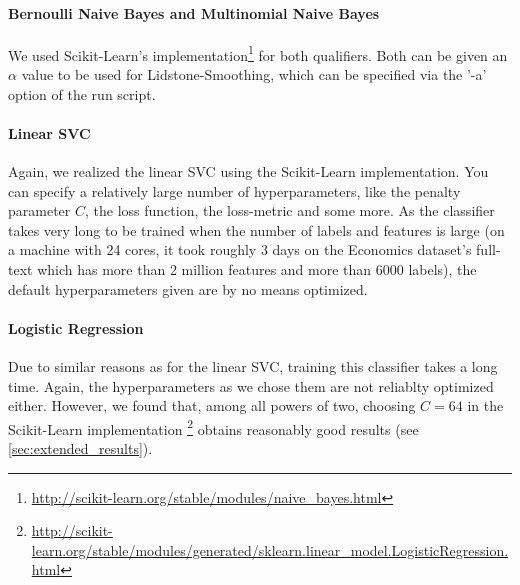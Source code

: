 \documentclass{article}
\begin{document}
\paragraph{Bernoulli Naive Bayes and Multinomial Naive Bayes}
We used Scikit-Learn's implementation\footnote{\url{http://scikit-learn.org/stable/modules/naive_bayes.html}} for both qualifiers.
Both can be given an $\alpha$ value to be used for Lidstone-Smoothing, which can be specified via the '-a' option of the run script.
\paragraph{Linear SVC}
Again, we realized the linear SVC using the Scikit-Learn implementation. You can specify a relatively large number of
hyperparameters, like the penalty parameter $C$, the loss function, the loss-metric and some more. As the
classifier takes very long to be trained when the number of labels and features is large (on a machine with 24 cores, it took
roughly 3 days on the Economics dataset's full-text which has more than 2 million features and more than 6000 labels),
the default hyperparameters given are by no means optimized.
\paragraph{Logistic Regression}
Due to similar reasons as for the linear SVC, training this classifier takes a long time. Again, the hyperparameters
as we chose them are not reliablty optimized either.
However, we found that, among all powers of two, choosing $C = 64$ in the Scikit-Learn implementation \footnote{\url{http://scikit-learn.org/stable/modules/generated/sklearn.linear_model.LogisticRegression.html}}
obtains reasonably good results (see \ref{sec:extended_results}).
\end{document}
